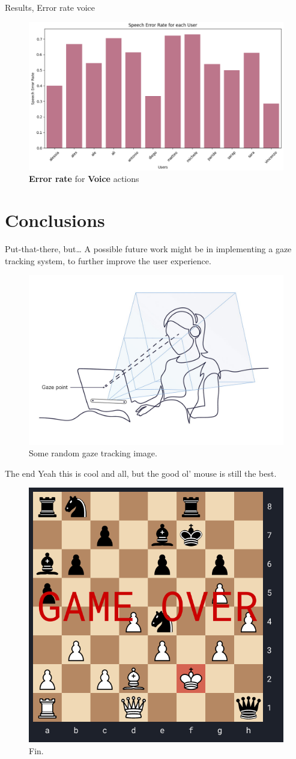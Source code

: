 \documentclass[english]{beamer}
\begin{document}
\begin{frame}{Results, Error rate voice}
    \begin{figure}
        \centering
        \includegraphics[width=.8\textwidth]{images/speech_error_rate.png}
        \caption{\textbf{Error rate} for \textbf{Voice} actions}
    \end{figure}
\end{frame}

\section{Conclusions}
\begin{frame}{Put-that-there, but\dots}
    A possible future work might be in implementing a gaze tracking system, to further improve the user experience.
    \begin{figure}
        \centering
        \includegraphics[width=.6\textwidth]{images/girl_tracking.jpg}
        \caption{Some random gaze tracking image.}
    \end{figure}
\end{frame}

\begin{frame}{The end}
    Yeah this is cool and all, but the good ol' mouse is still the best.
    \begin{figure}
        \centering
        \includegraphics[width=.45\textwidth]{images/game_over_small.png}
        \caption{Fin.}
    \end{figure}
\end{frame}
\end{document}
